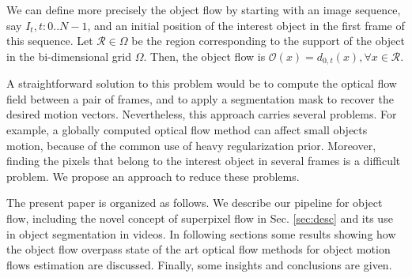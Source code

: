 We can define more precisely the object flow by starting with an image sequence, say $I_t, t:0..N-1$, and an initial 
position of the interest object in the first frame of this sequence. Let $\mathcal{R} \in \Omega$ be the region corresponding to the support of the object in the
bi-dimensional grid $\Omega$. Then, the object flow is $\mathcal{O}(x) = d_{0,t}(x), \forall x \in \mathcal{R}$.

A straightforward solution to this problem would be to compute the optical flow field between a pair of frames, and to apply 
a segmentation mask to recover the desired motion vectors. Nevertheless, this approach carries several 
problems. For example, a globally computed optical flow method can affect small objects motion, because of 
the common use of heavy regularization prior. Moreover, finding the pixels that belong to the interest object in several frames is a difficult problem. 
We propose an approach to reduce these problems.

The present paper is organized as follows. We describe our pipeline for object flow, including the novel concept of superpixel flow
in Sec. \ref{sec:desc} and its use in object segmentation in videos. In following
sections some results showing how 
the object flow overpass state of the art optical flow methods for object motion flows 
estimation are discussed. Finally, some insights and conclusions are given.

